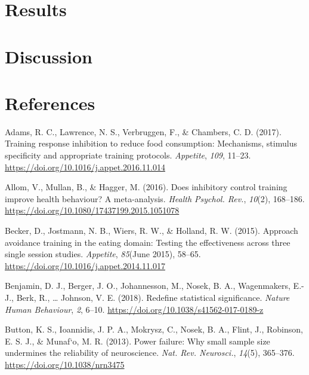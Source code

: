 \documentclass[man,floatsintext]{apa6}
\begin{document}
\section{Results}\label{results}

\section{Discussion}\label{discussion}

\newpage

\section{References}\label{references}

\begingroup
\setlength{\parindent}{-0.5in} \setlength{\leftskip}{0.5in}

\hypertarget{refs}{}
\hypertarget{ref-adams_training_2017}{}
Adams, R. C., Lawrence, N. S., Verbruggen, F., \& Chambers, C. D.
(2017). Training response inhibition to reduce food consumption:
Mechanisms, stimulus specificity and appropriate training protocols.
\emph{Appetite}, \emph{109}, 11--23.
\url{https://doi.org/10.1016/j.appet.2016.11.014}

\hypertarget{ref-allom_does_2016}{}
Allom, V., Mullan, B., \& Hagger, M. (2016). Does inhibitory control
training improve health behaviour? A meta-analysis. \emph{Health
Psychol. Rev.}, \emph{10}(2), 168--186.
\url{https://doi.org/10.1080/17437199.2015.1051078}

\hypertarget{ref-becker_approach_2015-1}{}
Becker, D., Jostmann, N. B., Wiers, R. W., \& Holland, R. W. (2015).
Approach avoidance training in the eating domain: Testing the
effectiveness across three single session studies. \emph{Appetite},
\emph{85}(June 2015), 58--65.
\url{https://doi.org/10.1016/j.appet.2014.11.017}

\hypertarget{ref-benjamin_redefine_2017}{}
Benjamin, D. J., Berger, J. O., Johannesson, M., Nosek, B. A.,
Wagenmakers, E.-J., Berk, R., \ldots{} Johnson, V. E. (2018). Redefine
statistical significance. \emph{Nature Human Behaviour}, \emph{2},
6--10. \url{https://doi.org/10.1038/s41562-017-0189-z}

\hypertarget{ref-button_power_2013}{}
Button, K. S., Ioannidis, J. P. A., Mokrysz, C., Nosek, B. A., Flint,
J., Robinson, E. S. J., \& Munaf\a`o, M. R. (2013). Power failure: Why
small sample size undermines the reliability of neuroscience. \emph{Nat.
Rev. Neurosci.}, \emph{14}(5), 365--376.
\url{https://doi.org/10.1038/nrn3475}
\end{document}
